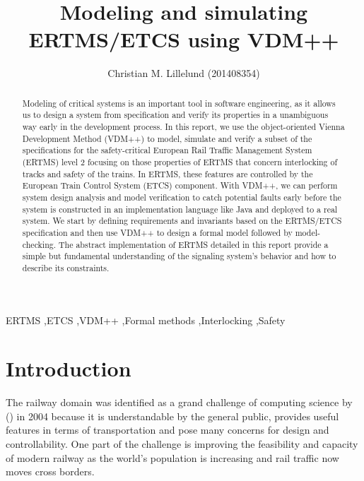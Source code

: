 \documentclass[preprint,12pt]{elsarticle}
\begin{document}
\begin{frontmatter}

\title{Modeling and simulating ERTMS/ETCS using VDM++}


\author{Christian M. Lillelund (201408354)}

\address{School of Engineering, Aarhus University}

\address{Course: E18 - Modeling of Critical Systems}

\begin{abstract}
Modeling of critical systems is an important tool in software engineering, as it allows us to design a system
from specification and verify its properties in a unambiguous way early in the development process. In this report, we use the object-oriented Vienna Development Method (VDM++) to model, simulate and verify a subset of the specifications for the safety-critical European Rail Traffic Management System (ERTMS) level 2 focusing on those properties of ERTMS that concern interlocking of tracks and safety of the trains. In ERTMS, these features are controlled by the European Train Control System (ETCS) component. With VDM++, we can perform system design analysis and model verification to catch potential faults early before the system is constructed in an implementation language like Java and deployed to a real system. We start by defining requirements and invariants based on the ERTMS/ETCS specification and then use VDM++ to design a formal model followed by model-checking. The abstract implementation of ERTMS detailed in this report provide a simple but fundamental understanding of the signaling system's behavior and how to describe its constraints.
\end{abstract}

\begin{keyword}
ERTMS \sep ETCS \sep VDM++ \sep Formal methods \sep Interlocking \sep Safety
\end{keyword}

\end{frontmatter}

\section{Introduction}
\label{S:introduction}
The railway domain was identified as a grand challenge of computing science by (\citet{Challenge}) in 2004 because it is understandable by the general public, provides useful features in terms of transportation and pose many concerns for design and controllability. One part of the challenge is improving the feasibility and capacity of modern railway as the world's population is increasing and rail traffic now moves cross borders.
\end{document}
